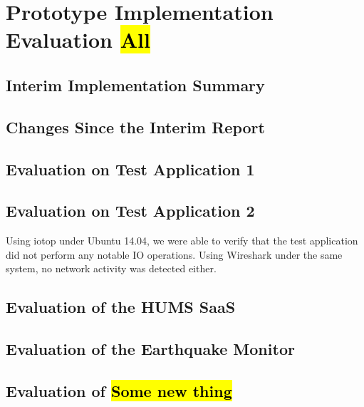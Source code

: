 \documentclass[10pt,a4paper]{article}
\begin{document}
\section{Prototype Implementation Evaluation \hl{All}}
\label{sec:prototype}


\subsection{Interim Implementation Summary}
\label{sec:interim_summary}


\subsection{Changes Since the Interim Report}
\label{sec:changes}

\subsection{Evaluation on Test Application 1}
\label{sec:test_app1}


\subsection{Evaluation on Test Application 2}
\label{sec:test_app2}

Using iotop under Ubuntu 14.04, we were able to verify that the test application did not perform any notable IO operations. Using Wireshark under the same system, no network activity was detected either.

\subsection{Evaluation of the HUMS SaaS}
\label{sec:hums_saas}


\subsection{Evaluation of the Earthquake Monitor}
\label{sec:earthquake}


\subsection{Evaluation of \hl{Some new thing}}
\label{sec:new_thing} %
\end{document}
